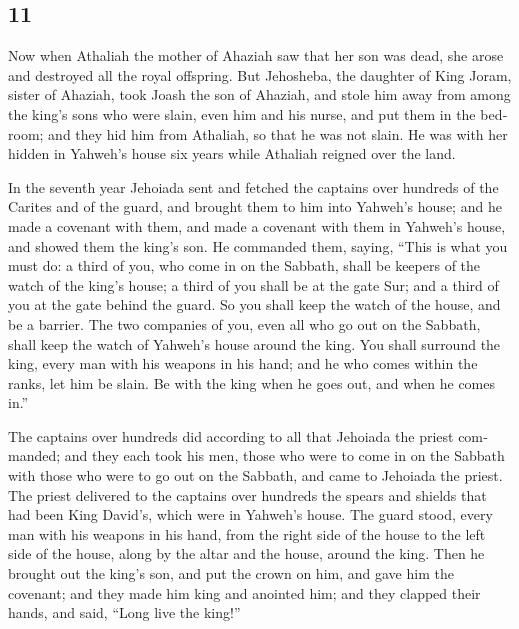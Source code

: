 \begin{paracol}{2}
\switchcolumn
\begin{otherlanguage}{english}

\hypertarget{section-21}{%
\section{11}\label{section-21}}

 Now when Athaliah the mother of Ahaziah saw that her son
was dead, she arose and destroyed all the royal offspring.
 But Jehosheba, the daughter of King Joram, sister of
Ahaziah, took Joash the son of Ahaziah, and stole him away from among
the king's sons who were slain, even him and his nurse, and put them in
the bedroom; and they hid him from Athaliah, so that he was not slain.
 He was with her hidden in Yahweh's house six years while
Athaliah reigned over the land.

 In the seventh year Jehoiada sent and fetched the
captains over hundreds of the Carites and of the guard, and brought them
to him into Yahweh's house; and he made a covenant with them, and made a
covenant with them in Yahweh's house, and showed them the king's son.
 He commanded them, saying, ``This is what you must do: a
third of you, who come in on the Sabbath, shall be keepers of the watch
of the king's house;  a third of you shall be at the gate
Sur; and a third of you at the gate behind the guard. So you shall keep
the watch of the house, and be a barrier.  The two
companies of you, even all who go out on the Sabbath, shall keep the
watch of Yahweh's house around the king.  You shall
surround the king, every man with his weapons in his hand; and he who
comes within the ranks, let him be slain. Be with the king when he goes
out, and when he comes in.''

 The captains over hundreds did according to all that
Jehoiada the priest commanded; and they each took his men, those who
were to come in on the Sabbath with those who were to go out on the
Sabbath, and came to Jehoiada the priest.  The priest
delivered to the captains over hundreds the spears and shields that had
been King David's, which were in Yahweh's house.  The
guard stood, every man with his weapons in his hand, from the right side
of the house to the left side of the house, along by the altar and the
house, around the king.  Then he brought out the king's
son, and put the crown on him, and gave him the covenant; and they made
him king and anointed him; and they clapped their hands, and said,
``Long live the king!''


\end{otherlanguage}
\end{paracol}
